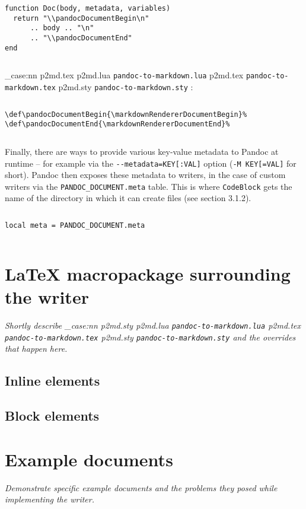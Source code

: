 \documentclass[
  digital,     %
  oneside,     %
  nosansbold,  %
  nocolorbold, %
  lof,         %
  nolot,       %
]{fithesis4}
\newcommand\file[1]
  {
    \str_case:nn
      { #1 }
      {
        { p2md.lua } { \texttt{pandoc\hyp{}to\hyp{}markdown.lua} }
        { p2md.tex } { \texttt{pandoc\hyp{}to\hyp{}markdown.tex} }
        { p2md.sty } { \texttt{pandoc\hyp{}to\hyp{}markdown.sty} }
      }
  }
\begin{document}
$ $

\noindent
\lstset{language=[5.3]Lua}
\begin{lstlisting}
function Doc(body, metadata, variables)
  return "\\pandocDocumentBegin\n"
      .. body .. "\n"
      .. "\\pandocDocumentEnd"
end
\end{lstlisting}

$ $

\noindent
\file{p2md.tex}:

$ $

\noindent
\lstset{language=[plain]TeX}
\begin{lstlisting}
\def\pandocDocumentBegin{\markdownRendererDocumentBegin}%
\def\pandocDocumentEnd{\markdownRendererDocumentEnd}%
\end{lstlisting}

$ $

\noindent
Finally, there are ways to provide various key-value metadata to Pandoc at runtime -- for example via the \texttt{-{}-metadata=KEY[:VAL]} option (\texttt{-M KEY[=VAL]} for short). Pandoc then exposes these metadata to writers, in the case of custom writers via the \texttt{PANDOC\_DOCUMENT.meta} table. This is where \texttt{CodeBlock} gets the name of the directory in which it can create files (see section 3.1.2).

$ $

\noindent
\lstset{language=[5.3]Lua}
\begin{lstlisting}
local meta = PANDOC_DOCUMENT.meta
\end{lstlisting}

$ $

\section{\LaTeX{} macropackage surrounding the writer}
\emph{Shortly describe \file{p2md.sty} and the overrides that happen here.}
\subsection{Inline elements}
\subsection{Block elements}

\section{Example documents}
\emph{Demonstrate specific example documents and the problems they posed while implementing the writer. \label{fig:html-browsers-typeset} }
\end{document}

